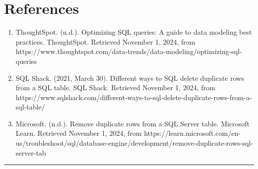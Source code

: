 \documentclass[12pt, french]{article}
\providecommand{\tightlist}{%
      \setlength{\itemsep}{0pt}\setlength{\parskip}{0pt}}
\begin{document}
\section{References}\label{references}

\begin{enumerate}
\def\labelenumi{\arabic{enumi}.}
\tightlist
\item
  ThoughtSpot. (n.d.). Optimizing SQL queries: A guide to data modeling
  best practices. ThoughtSpot. Retrieved November 1, 2024, from
  https://www.thoughtspot.com/data-trends/data-modeling/optimizing-sql-queries
\item
  SQL Shack. (2021, March 30). Different ways to SQL delete duplicate
  rows from a SQL table. SQL Shack. Retrieved November 1, 2024, from
  https://www.sqlshack.com/different-ways-to-sql-delete-duplicate-rows-from-a-sql-table/
\item
  Microsoft. (n.d.). Remove duplicate rows from a SQL Server table.
  Microsoft Learn. Retrieved November 1, 2024, from
  https://learn.microsoft.com/en-us/troubleshoot/sql/database-engine/development/remove-duplicate-rows-sql-server-tab
\end{enumerate}

    \begin{center}\rule{0.5\linewidth}{0.5pt}\end{center}




    
\end{document}
